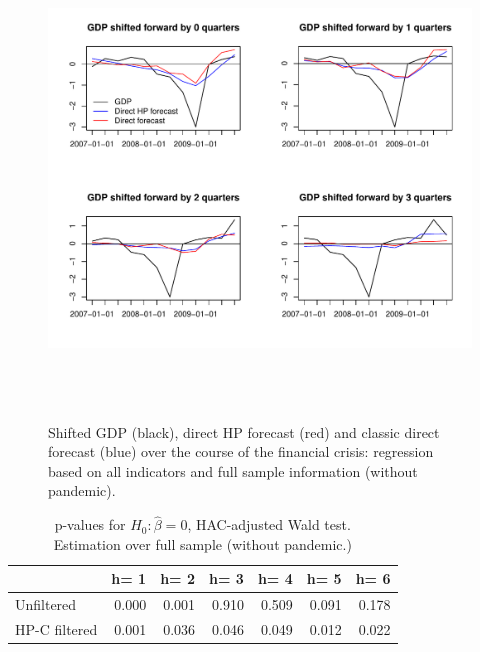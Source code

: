 \documentclass[11pt,a4paper]{article}
\begin{document}
\begin{figure}[H]
    \begin{center}
        \includegraphics[height=5in, width=6in]{./Figures/direct_hp_forecasts_financial_crisis.pdf}
        \caption{Shifted GDP (black), direct HP forecast (red) and classic direct forecast (blue) over the course of the financial crisis: regression based on all indicators and full sample information (without pandemic).
        \label{direct_hp_forecasts_financial_crisis}}
    \end{center}
\end{figure}


\begin{table}[h]
\centering
\begin{tabular}{lrrrrrr}
  \hline
  & h= 1 & h= 2 & h= 3 & h= 4 & h= 5 & h= 6 \\ 
  \hline
  Unfiltered & 0.000 & 0.001 & 0.910 & 0.509 & 0.091 & 0.178 \\ 
HP-C filtered & 0.001 & 0.036 & 0.046 & 0.049 & 0.012 & 0.022 \\ 
   \hline
\end{tabular}
\caption{p-values for $H_0: \hat{\beta} = 0$, HAC-adjusted Wald test.\\Estimation over full sample (without pandemic.)} 
\label{tab:pvaluedhp}
\end{table}
\end{document}
